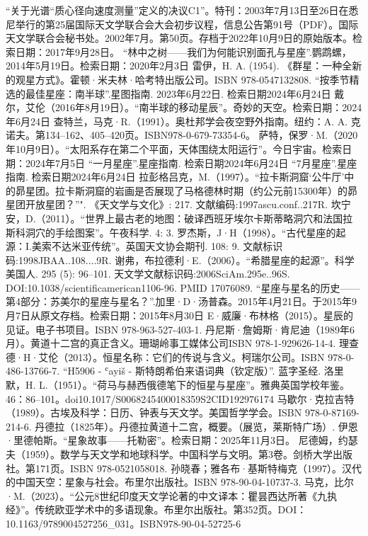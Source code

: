 \begin{itemize}
 “关于光谱“质心径向速度测量”定义的决议C1”。特刊：2003年7月13日至26日在悉尼举行的第25届国际天文学联合会大会初步议程，信息公告第91号（PDF）。国际天文学联合会秘书处。2002年7月。第50页。存档于2022年10月9日的原始版本。检索日期：2017年9月28日。
 “林中之树——我们为何能识别面孔与星座”.鹦鹉螺，2014年5月19日。检索日期：2020年2月3日
 雷伊，H. A. (1954). 《群星：一种全新的观星方式》。霍顿·米夫林·哈考特出版公司。ISBN 978-0547132808.
 “按季节精选的最佳星座：南半球”.星图指南. 2023年6月22日. 检索日期2024年6月24日
 戴尔，艾伦（2016年8月19日）。“南半球的移动星辰”。奇妙的天空。检索日期：2024年6月24日
 查特兰，马克·R.（1991）。奥杜邦学会夜空野外指南。纽约：A. A. 克诺夫。第134–162、405–420页。ISBN978-0-679-73354-6。
 萨特，保罗·M.（2020年10月9日）。“太阳系存在第二个平面，天体围绕太阳运行”。今日宇宙。检索日期：2024年7月5日
 “一月星座”.星座指南. 检索日期2024年6月24日
 “7月星座”.星座指南. 检索日期2024年6月24日
 拉彭格吕克，M.（1997）。“拉卡斯洞窟‘公牛厅’中的昴星团。拉卡斯洞窟的岩画是否展现了马格德林时期（约公元前15300年）的昴星团开放星团？”". 《天文学与文化》: 217. 文献编码:1997ascu.conf..217R.
 坎宁安，D.（2011）。“世界上最古老的地图：破译西班牙埃尔卡斯蒂略洞穴和法国拉斯科洞穴的手绘图案”。午夜科学. 4: 3.
 罗杰斯，J·H（1998）。“古代星座的起源：I.美索不达米亚传统”。英国天文协会期刊. 108: 9. 文献标识码:1998JBAA..108....9R.
 谢弗，布拉德利·E.（2006）。“希腊星座的起源”。科学美国人. 295 (5): 96–101. 天文学文献标识码:2006SciAm.295e..96S. DOI:10.1038/scientificamerican1106-96. PMID 17076089.
 “星座与星名的历史——第4部分：苏美尔的星座与星名？”.加里·D·汤普森。2015年4月21日。于2015年9月7日从原文存档。检索日期：2015年8月30日
 E·威廉·布林格（2015）。星辰的见证。电子书项目。ISBN 978-963-527-403-1.
 丹尼斯·詹姆斯·肯尼迪（1989年6月）。黄道十二宫的真正含义。珊瑚岭事工媒体公司ISBN 978-1-929626-14-4.
 理查德·H·艾伦（2013）。恒星名称：它们的传说与含义。柯瑞尔公司。ISBN 978-0-486-13766-7.
 “H5906 - ʿayiš - 斯特朗希伯来语词典（钦定版）”. 蓝字圣经.
 洛里默，H. L.（1951）。“荷马与赫西俄德笔下的恒星与星座”。雅典英国学校年鉴。46：86–101。doi10.1017/S0068245400018359S2CID192976174
 马歇尔·克拉吉特（1989）。古埃及科学：日历、钟表与天文学。美国哲学学会。ISBN 978-0-87169-214-6.
 丹德拉（1825年）。丹德拉黄道十二宫，概要。（展览，莱斯特广场）.
 伊恩·里德帕斯。“星象故事——托勒密”。检索日期：2025年11月3日。
 尼德姆，约瑟夫（1959）。数学与天文学和地球科学。中国科学与文明。第3卷。剑桥大学出版社。第171页。ISBN 978-0521058018.
 孙晓春；雅各布·基斯特梅克（1997）。汉代的中国天空：星象与社会。布里尔出版社。ISBN 978-90-04-10737-3.
 马克，比尔·M.（2023）。“公元8世纪印度天文学论著的中文译本：瞿昙西达所著《九执经》”。传统欧亚学术中的多语现象。布里尔出版社。第352页。DOI：10.1163/9789004527256_031。ISBN978-90-04-52725-6

\end{itemize}
